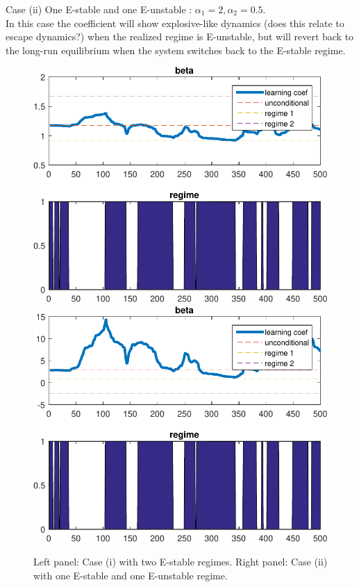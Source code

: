 \documentclass[12pt,reqno]{article}
\numberwithin{equation}{section}
\begin{document}
Case (ii) One E-stable and one E-unstable : $ \alpha_1 = 2, \alpha_2 = 0.5 $. \\
In this case the coefficient will show explosive-like dynamics (does this relate to escape dynamics?) when the realized regime is E-unstable, but will revert back to the long-run equilibrium when the system switches back to the E-stable regime. 

\begin{figure}[H]
\caption{Left panel: Case (i) with two E-stable regimes. Right panel: Case (ii) with one E-stable and one E-unstable regime. }
\includegraphics[scale=0.6]{fisher_simulation1_learningCoef.pdf} 
\includegraphics[scale=0.6]{fisher_simulation2_learningCoef.pdf} \\

\end{figure}
\end{document}
